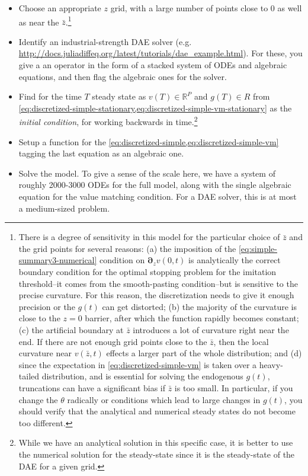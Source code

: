 \documentclass[11pt]{article}
\newcommand{\D}[1][]{\ensuremath{\boldsymbol{\partial}_{#1}}}
\newcommand{\R}{\ensuremath{\mathbb{R}}}
\begin{document}
\begin{itemize}
	\item Choose an appropriate $z$ grid, with a large number of points close to $0$ as well as near the $\bar{z}$.\footnote{There is a degree of sensitivity in this model for the particular choice of $\bar{z}$ and the grid points for several reasons: (a) the imposition of the \cref{eq:simple-summary3-numerical} condition on $\D[z]v(0,t)$  is analytically the correct boundary condition for the optimal stopping problem for the imitation threshold--it comes from the smooth-pasting condition--but is sensitive to the precise curvature.  For this reason, the discretization needs to give it enough precision or the $g(t)$ can get distorted; (b) the majority of the curvature is close to the $z=0$ barrier, after which the function rapidly becomes constant; (c) the artificial boundary at $\bar{z}$ introduces a lot of curvature right near the end.  If there are not enough grid points close to the $\bar{z}$, then the local curvature near $v(\bar{z},t)$ effects a larger part of the whole distribution; and (d) since the expectation in \cref{eq:discretized-simple-vm} is taken over a heavy-tailed distribution, and is essential for solving the endogenous $g(t)$, truncations can have a significant bias if $\bar{z}$ is too small.  In particular, if you change the $\theta$ radically or conditions which lead to large changes in $g(t)$, you should verify that the analytical and numerical steady states do not become too different.}
	\item Identify an industrial-strength DAE solver (e.g. \url{http://docs.juliadiffeq.org/latest/tutorials/dae_example.html}).  For these, you give a an operator in the form of a stacked system of ODEs and algebraic equations, and then flag the algebraic ones for the solver.
	\item Find for the time $T$ steady state as $v(T) \in \R^P$ and $g(T) \in R$ from \cref{eq:discretized-simple-stationary,eq:discretized-simple-vm-stationary} as the \textit{initial condition}, for working backwards in time.\footnote{While we have an analytical solution in this specific case, it is better to use the numerical solution for the steady-state since it is the steady-state of the DAE for a given grid.}
	\item Setup a function for the \cref{eq:discretized-simple,eq:discretized-simple-vm} tagging the last equation as an algebraic one.
	\item Solve the model.  To give a sense of the scale here, we have a system of roughly 2000-3000 ODEs for the full model, along with the single algebraic equation for the value matching condition.  For a DAE solver, this is at most a medium-sized problem.
\end{itemize}
\end{document}
